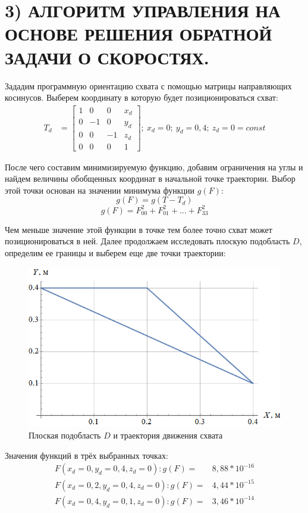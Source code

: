 \chapter{\MakeUppercase{3)	Алгоритм управления на основе решения обратной задачи о скоростях.}}
Зададим программную ориентацию схвата с помощью матрицы направляющих косинусов. Выберем координату в которую будет позиционироваться схват:
\begin{align*}
    T_d &=\begin{bmatrix}
    1 &  0 &  0 & x_d \\
    0 & -1 &  0 & y_d \\
    0 &  0 & -1 & z_d \\
    0 &  0 &  0 & 1
    \end{bmatrix}; \:
    x_d = 0; \:
    y_d = 0,4; \:
    z_d = 0 = const
\end{align*}

\noindent После чего составим минимизируемую функцию, добавим ограничения на углы и найдем величины обобщенных координат в начальной точке траектории. Выбор этой точки основан на значении минимума функции $ g(F) $:
$$ g(F) = g(T - T_d) $$
$$ g(F) = F_{00}^2 + F_{01}^2 + \hdots + F_{33}^2 $$

\noindent Чем меньше значение этой функции в точке тем более точно схват может позиционироваться в ней. Далее продолжаем исследовать плоскую подобласть $ D $, определим ее границы и выберем еще две точки траектории:

\begin{figure}[ht]
    \centering
    \includegraphics[scale=0.65]{plot_part3.png}
    \caption{Плоская подобласть $ D $ и траектория движения схвата}
\end{figure}
\newpage

\noindent Значения функций в трёх выбранных точках:
\begin{align*}
    F(x_d=0 , y_d=0,4 , z_d=0): g(F)=& 8,88*10^{-16} \\
    F(x_d=0,2 , y_d=0,4 , z_d=0): g(F)=& 4,44*10^{-15} \\
    F(x_d=0,4 , y_d=0,1 , z_d=0): g(F)=& 3,46*10^{-14}
\end{align*}




